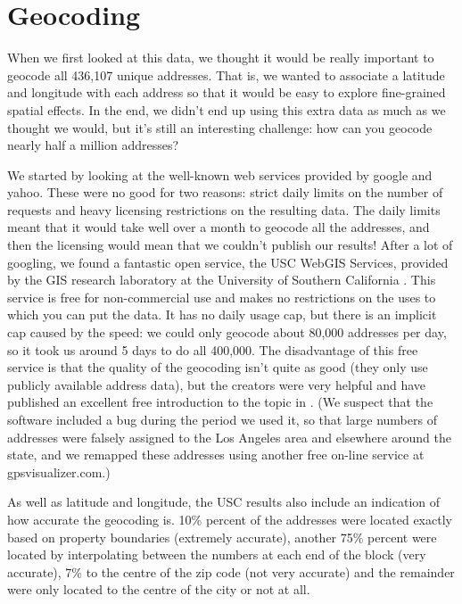 \documentclass[oneside]{article}
\begin{document}
\section{Geocoding} 

When we first looked at this data, we thought it would be really important to geocode all 436,107 unique addresses.  That is, we wanted to associate a latitude and longitude with each address so that it would be easy to explore fine-grained spatial effects.  In the end, we didn't end up using this extra data as much as we thought we would, but it's still an interesting challenge: how can you geocode nearly half a million addresses?  

We started by looking at the well-known web services provided by google and yahoo.  These were no good for two reasons: strict daily limits on the number of requests and heavy licensing restrictions on the resulting data.  The daily limits meant that it would take well over a month to geocode all the addresses, and then the licensing would mean that we couldn't publish our results!  After a lot of googling, we found a fantastic open service, the USC WebGIS Services, provided by the GIS research laboratory at the University of Southern California \citep{uscgis}.  This service is free for non-commercial use and makes no restrictions on the uses to which you can put the data.  It has no daily usage cap, but there is an implicit cap caused by the speed: we could only geocode about 80,000 addresses per day, so it took us around 5 days to do all 400,000.  The disadvantage of this free service is that the quality of the geocoding isn't quite as good (they only use publicly available address data), but the creators were very helpful and have published an excellent free introduction to the topic in \citet{goldberg:2008}.  (We suspect that the software included a bug during the period we used it, so that large numbers of addresses were falsely assigned to the Los Angeles area and elsewhere around the state, and we remapped these addresses using another free on-line service at gpsvisualizer.com.)

As well as latitude and longitude, the USC results also include an indication of how accurate the geocoding is.  10\%  percent of the addresses were located exactly based on property boundaries (extremely accurate), another 75\% percent were located by interpolating between the numbers at each end of the block (very accurate), 7\% to the centre of the zip code (not very accurate) and the remainder were only located to the centre of the city or not at all.  
\end{document}
